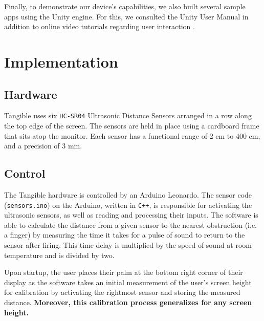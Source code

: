 \documentclass{article}
\begin{document}
Finally, to demonstrate our device’s capabilities, we also built several sample apps using the Unity engine. For this, we consulted the Unity User Manual in addition to online video tutorials regarding user interaction \cite{10,11,12}.

\section{Implementation}
\subsection{Hardware}
Tangible uses six \verb+HC-SR04+ Ultrasonic Distance Sensors arranged in a row along the top edge of the screen. The sensors are held in place using a cardboard frame that sits atop the monitor. Each sensor has a functional range of 2 cm to 400 cm, and a precision of 3 mm.

\subsection{Control}
The Tangible hardware is controlled by an Arduino Leonardo. The sensor code (\verb-sensors.ino-) on the Arduino, written in \verb-C++-, is responsible for activating the ultrasonic sensors, as well as reading and processing their inputs. The software is able to calculate the distance from a given sensor to the nearest obstruction (i.e. a finger) by measuring the time it takes for a pulse of sound to return to the sensor after firing. This time delay is multiplied by the speed of sound at room temperature and is divided by two.

Upon startup, the user places their palm at the bottom right corner of their display as the software takes an initial measurement of the user’s screen height for calibration by activating the rightmost sensor and storing the measured distance. \textbf{Moreover, this calibration process generalizes for any screen height.}
\end{document}
